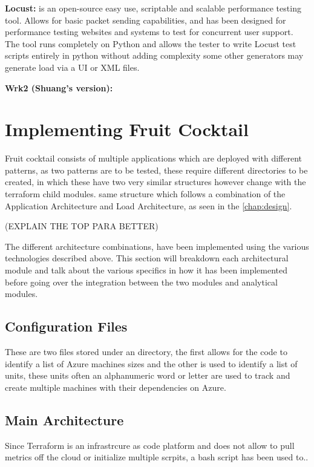 \textbf{Locust: }is an open-source easy use, scriptable and scalable performance testing tool. Allows for basic packet sending capabilities, and has been designed for performance testing websites and systems to test for concurrent user support. The tool runs completely on Python and allows the tester to write Locust test scripts entirely in python without adding complexity some other generators may generate load via a UI or XML files. 


\textbf{Wrk2 (Shuang's version): }




\section{Implementing Fruit Cocktail}
Fruit cocktail consists of multiple applications which are deployed with different patterns, as two patterns are to be tested, these require different directories to be created, in which these have two very similar structures however change with the terraform child modules. same structure which follows a combination of the Application Architecture and Load Architecture, as seen in the \autoref{chap:design}. 

(EXPLAIN THE TOP PARA BETTER)


The different architecture combinations, have been implemented using the various technologies described above. This section will breakdown each architectural module and talk about the various specifics in how it has been implemented before going over the integration between the two modules and analytical modules. 

\subsection{Configuration Files}
These are two files stored under an  directory, the first  allows for the code to identify a list of Azure machines sizes and the other  is used to identify a list of units, these units often an alphanumeric word or letter are used to track and create multiple machines with their dependencies on Azure.

\subsection{Main Architecture}
Since Terraform is an infrastrcure as code platform and does not allow to pull metrics off the cloud or initialize multiple scrpits, a bash script has been used to..

